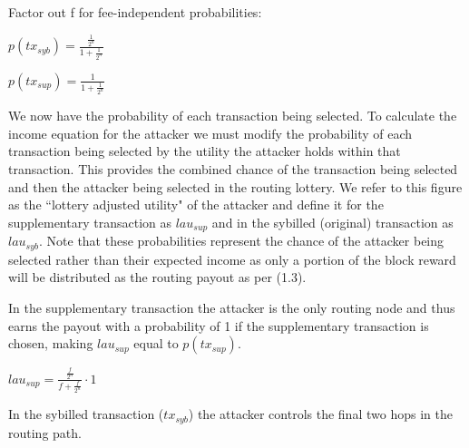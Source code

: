 \documentclass[oneside]{article}   	%
\begin{document}
\begin{multicols}{2}
Factor out f for fee-independent probabilities:

\large
\begin{adjustwidth}{1.5em}{1.5em} 
	\begin{math}
p(tx_{syb}) = \frac{\frac{1}{2^n}}{1 + \frac{1}{2^n}}
	\end{math}

	\begin{math}
p(tx_{sup}) = \frac{1}{1 + \frac{1}{2^n}}
	\end{math}
\end{adjustwidth}
\normalsize

We now have the probability of each transaction being selected. To calculate the income equation for the attacker we must modify the probability of each transaction being selected by the utility the attacker holds within that transaction. This provides the combined chance of the transaction being selected and then the attacker being selected in the routing lottery. We refer to this figure as the ``lottery adjusted utility" of the attacker and define it for the supplementary transaction as \begin{math}lau_{sup}\end{math} and in the sybilled (original) transaction as \begin{math}lau_{syb}\end{math}. Note that these probabilities represent the chance of the attacker being selected rather than their expected income as only a portion of the block reward will be distributed as the routing payout as per (1.3).

In the supplementary transaction the attacker is the only routing node and thus earns the payout with a probability of 1 if the supplementary transaction is chosen, making \begin{math}lau_{sup}\end{math} equal to \begin{math}p(tx_{sup})\end{math}.

\large
\begin{adjustwidth}{1.5em}{1.5em} 
	\begin{math}
lau_{sup} = \frac{\frac{f}{2^n}}{f + \frac{f}{2^n}} \cdot 1
	\end{math}
\end{adjustwidth}
\normalsize

In the sybilled transaction (\begin{math}tx_{syb}\end{math}) the attacker controls the final two hops in the routing path.


\end{multicols}
\end{document}
